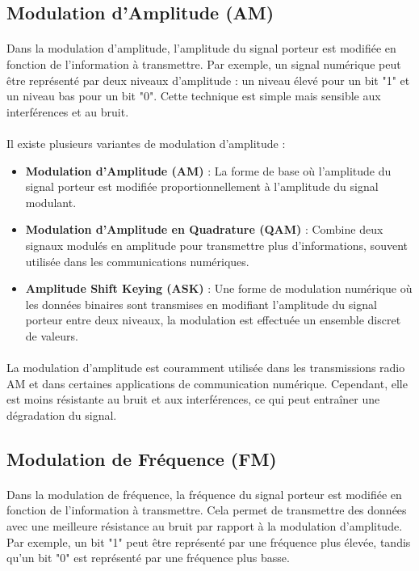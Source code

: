 \documentclass[a4paper,draft,twocolumn]{report}
\begin{document}
\subsection{Modulation d'Amplitude (AM)}
\paragraph{}Dans la modulation d'amplitude, l'amplitude du signal porteur est modifiée en fonction de l'information à transmettre. Par exemple, un signal numérique peut être représenté par deux niveaux d'amplitude : un niveau élevé pour un bit "1" et un niveau bas pour un bit "0". Cette technique est simple mais sensible aux interférences et au bruit.
\paragraph{}Il existe plusieurs variantes de modulation d'amplitude :
\begin{itemize}
    \item \textbf{Modulation d'Amplitude (AM)} : La forme de base où l'amplitude du signal porteur est modifiée proportionnellement à l'amplitude du signal modulant.
    \item \textbf{Modulation d'Amplitude en Quadrature (QAM)} : Combine deux signaux modulés en amplitude pour transmettre plus d'informations, souvent utilisée dans les communications numériques.
    \item \textbf{Amplitude Shift Keying (ASK)} : Une forme de modulation numérique où les données binaires sont transmises en modifiant l'amplitude du signal porteur entre deux niveaux, la modulation est effectuée un ensemble discret de valeurs.
\end{itemize}
\paragraph{}La modulation d'amplitude est couramment utilisée dans les transmissions radio AM et dans certaines applications de communication numérique. Cependant, elle est moins résistante au bruit et aux interférences, ce qui peut entraîner une dégradation du signal.

\subsection{Modulation de Fréquence (FM)}
\paragraph{}Dans la modulation de fréquence, la fréquence du signal porteur est modifiée en fonction de l'information à transmettre. Cela permet de transmettre des données avec une meilleure résistance au bruit par rapport à la modulation d'amplitude. Par exemple, un bit "1" peut être représenté par une fréquence plus élevée, tandis qu'un bit "0" est représenté par une fréquence plus basse. 
\end{document}

